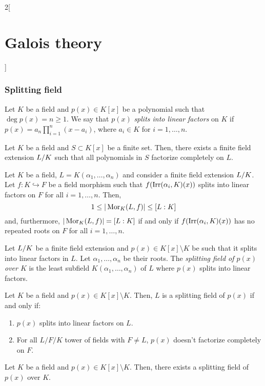 \documentclass[../../../main.tex]{subfiles}
\begin{document}
\begin{multicols}{2}[\section{Galois theory}]
  \subsubsection{Splitting field}
  \begin{definition}
    Let $K$ be a field and $p(x)\in K[x]$ be a polynomial such that $\deg p(x)=n\geq 1$. We say that $p(x)$ \textit{splits into linear factors} on $K$ if $p(x)=a_n\prod_{i=1}^n(x-a_i)$, where $a_i\in K$ for $i=1,\ldots,n$.
  \end{definition}
  \begin{theorem}
    Let $K$ be a field and $S\subset K[x]$ be a finite set. Then, there exists a finite field extension $\quot{L}{K}$ such that all polynomials in $S$ factorize completely on $L$.
  \end{theorem}
  \begin{theorem}
    Let $K$ be a field, $L=K(\alpha_1,\ldots,\alpha_n)$ and consider a finite field extension $\quot{L}{K}$. Let $f:K\hookrightarrow F$ be a field morphism such that $f(\operatorname{Irr}(\alpha_i,K)(x))$ splits into linear factors on $F$ for all $i=1,\ldots,n$. Then, $$1\leq|\operatorname{Mor}_K(L,f)|\leq [L:K]$$ and, furthermore, $|\operatorname{Mor}_K(L,f)|=[L:K]$ if and only if $f(\operatorname{Irr}(\alpha_i,K)(x))$ has no repeated roots on $F$ for all $i=1,\ldots,n$.
  \end{theorem}
  \begin{definition}
    Let $\quot{L}{K}$ be a finite field extension and $p(x)\in K[x]\setminus K$ be such that it splits into linear factors in $L$. Let $\alpha_1,\ldots,\alpha_n$ be their roots. The \textit{splitting field of $p(x)$ over $K$} is the least subfield $K(\alpha_1,\ldots,\alpha_n)$ of $L$ where $p(x)$ splits into linear factors.
  \end{definition}
  \begin{prop}
    Let $K$ be a field and $p(x)\in K[x]\setminus K$. Then, $L$ is a splitting field of $p(x)$ if and only if:
    \begin{enumerate}
      \item $p(x)$ splits into linear factors on $L$.
      \item For all $L/F/K$ tower of fields with $F\ne L$, $p(x)$ doesn't factorize completely on $F$.
    \end{enumerate}
  \end{prop}
  \begin{theorem}
    Let $K$ be a field and $p(x)\in K[x]\setminus K$. Then, there exists a splitting field of $p(x)$ over $K$.

\end{theorem}
\end{multicols}
\end{document}
